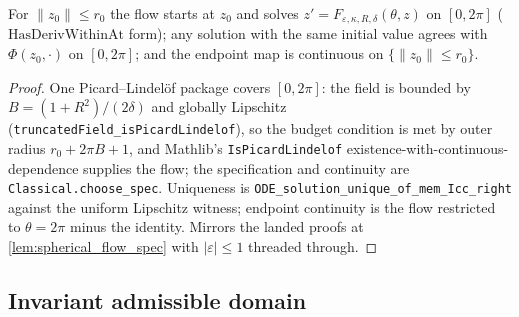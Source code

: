 \begin{lemma}
  \label{lem:spaceform_flow_spec}
  For $\|z_0\|\le r_0$ the flow starts at $z_0$ and solves
  $z'=F_{\varepsilon,\kappa,R,\delta}(\theta,z)$ on $[0,2\pi]$
  ($\mathrm{HasDerivWithinAt}$ form); any solution with the same initial
  value agrees with $\Phi(z_0,\cdot)$ on $[0,2\pi]$; and the endpoint map is
  continuous on $\{\|z_0\|\le r_0\}$.
\end{lemma}

\begin{proof}
  \leanok
  One Picard--Lindel\"of package covers $[0,2\pi]$: the field is bounded by
  $B=(1+R^2)/(2\delta)$ and globally Lipschitz
  (\texttt{truncatedField\_isPicardLindelof}), so the budget condition is met
  by outer radius $r_0+2\pi B+1$, and Mathlib's
  \texttt{IsPicardLindelof} existence-with-continuous-dependence supplies the
  flow; the specification and continuity are
  \texttt{Classical.choose\_spec}. Uniqueness is
  \texttt{ODE\_solution\_unique\_of\_mem\_Icc\_right} against the uniform
  Lipschitz witness; endpoint continuity is the flow restricted to
  $\theta=2\pi$ minus the identity. Mirrors the landed proofs at
  \cref{lem:spherical_flow_spec} with $|\varepsilon|\le1$ threaded through.
\end{proof}

\subsection{Invariant admissible domain}


